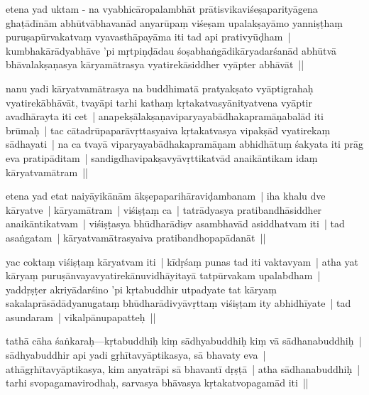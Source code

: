 \documentclass[article,12pt,a4paper]{memoir}
\begin{document}
	  \pstart etena yad uktam - na vyabhicāropalambhāt prātisvikaviśeṣaparityāgena ghaṭādīnām abhūtvābhavanād anyarūpaṃ viśeṣam upalakṣayāmo yanniṣṭhaṃ puruṣapūrvakatvaṃ vyavasthāpayāma iti tad api prativyūḍham | kumbhakārādyabhāve 'pi mṛtpiṇḍādau śoṣabhaṅgādikāryadarśanād abhūtvā \leavevmode{}\label{RNAms-29a} bhāvalakṣaṇasya kāryamātrasya vyatirekāsiddher vyāpter abhāvāt ||
	\pend
      

	  \pstart nanu yadi kāryatvamātrasya na buddhimatā pratyakṣato vyāptigrahaḥ vyatirekābhāvāt, tvayāpi tarhi kathaṃ kṛtakatvasyānityatvena vyāptir avadhārayta iti cet | anapekṣālakṣaṇaviparyayabādhakapramāṇabalād iti brūmaḥ | tac cātadrūpaparāvṛttasyaiva kṛtakatvasya vipakṣād vyatirekaṃ sādhayati | na ca tvayā viparyayabādhakapramāṇam abhidhātuṃ śakyata iti prāg eva pratipāditam | sandigdhavipakṣavyāvṛttikatvād anaikāntikam idaṃ kāryatvamātram ||
	\pend
      

	  \pstart etena yad etat naiyāyikānām ākṣepaparihāraviḍambanam | iha khalu dve kāryatve | kāryamātram | viśiṣṭaṃ ca | tatrādyasya pratibandhāsiddher anaikāntikatvam | viśiṣṭasya bhūdharādiṣv asambhavād asiddhatvam iti | tad asaṅgatam | kāryatvamātrasyaiva pratibandhopapādanāt ||
	\pend
      

	  \pstart yac coktaṃ viśiṣṭaṃ kāryatvam iti | kīdṛśaṃ punas tad iti vaktavyam | atha yat kāryaṃ puruṣānvayavyatirekānuvidhāyitayā tatpūrvakam upalabdham | yaddṛṣṭer akriyādarśino 'pi kṛtabuddhir utpadyate tat kāryaṃ sakalaprāsādādyanugataṃ bhūdharādivyāvṛttaṃ viśiṣṭam ity abhidhīyate | tad asundaram | vikalpānupapatteḥ ||
	\pend
      

	  \pstart {}\label{sarit__ratnakīrtinibandhāvali__139880}tathā cāha śaṅkaraḥ—kṛtabuddhiḥ kiṃ sādhyabuddhiḥ kiṃ vā sādhanabuddhiḥ | sādhyabuddhir api yadi gṛhītavyāptikasya, sā bhavaty eva | athāgṛhītavyāptikasya, kim anyatrāpi sā bhavantī dṛṣṭā | atha sādhanabuddhiḥ | tarhi svopagamavirodhaḥ, sarvasya bhāvasya kṛtakatvopagamād iti ||\label{sarit__ratnakīrtinibandhāvali__140214}
	\pend
      
\end{document}
